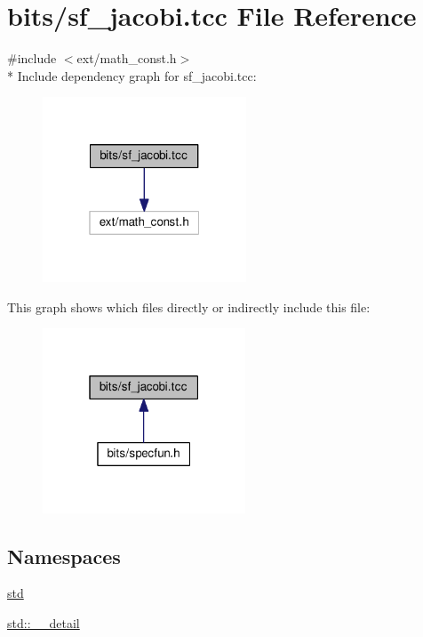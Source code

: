 \hypertarget{sf__jacobi_8tcc}{}\section{bits/sf\+\_\+jacobi.tcc File Reference}
\label{sf__jacobi_8tcc}
{\ttfamily \#include $<$ext/math\+\_\+const.\+h$>$}\\*
Include dependency graph for sf\+\_\+jacobi.\+tcc\+:
\nopagebreak
\begin{figure}[H]
\begin{center}
\leavevmode
\includegraphics[width=172pt]{sf__jacobi_8tcc__incl}
\end{center}
\end{figure}
This graph shows which files directly or indirectly include this file\+:
\nopagebreak
\begin{figure}[H]
\begin{center}
\leavevmode
\includegraphics[width=171pt]{sf__jacobi_8tcc__dep__incl}
\end{center}
\end{figure}
\subsection*{Namespaces}
\begin{DoxyCompactItemize}
\item 
 \hyperlink{namespacestd}{std}
\item 
 \hyperlink{namespacestd_1_1____detail}{std\+::\+\_\+\+\_\+detail}
\end{DoxyCompactItemize}
